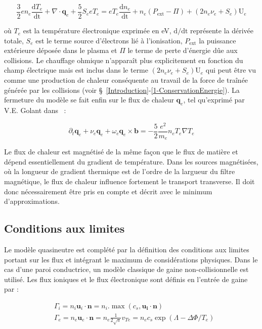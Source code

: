 \begin{refsection}
\begin{equation}
\label{1-eqTemperature2}
\frac{3}{2}en_e\frac{\text{d}T_e}{\text{dt}}+\nabla\cdot\mathbf
q_e + \frac{5}{2}S_e eT_e = eT_e\frac{\text{d}n_e}{\text{dt}}+ 
{n_e\left(P_\text{ext}-\Pi\right)}+(2n_e\nu_e+S_e)\text{U}_e
\end{equation}

où $T_e$ est la température électronique exprimée en eV, $\text{d/dt}$
représente la dérivée totale, $S_e$ est le terme source d'électrons lié à
l'ionisation, $P_\text{ext}$ la puissance extérieure déposée dans le plasma et
$\Pi$ le terme de perte d'énergie dûe aux collisions. Le chauffage
ohmique n'apparaît plus explicitement en fonction du champ électrique mais est
inclus dans le terme $(2n_e\nu_e+S_e)\text{U}_e$ qui peut être vu comme une
production de chaleur conséquente au travail de la force de traînée générée par
les collisions (voir \S~\ref{Introduction}-\ref{1-ConservationEnergie}).
La fermeture du modèle se fait enfin sur le flux de chaleur $\mathbf{q}_e$, tel qu'exprimé par V.E. Golant
dans~\parencite{Golant} :

\begin{equation}
\partial_t \mathbf{q}_e + \nu_e\mathbf{q}_e+\omega_e\mathbf{q}_e\times\mathbf{b} =
-\frac{5}{2}\frac{e^2}{m_e}n_eT_e\nabla T_e
\end{equation}

Le flux de chaleur est magnétisé de la même façon que le flux de matière et
dépend essentiellement du gradient de température. Dans les sources magnétisées,
où la longueur de gradient thermique est de l'ordre de la largueur
du filtre magnétique, le flux de chaleur influence fortement le transport
transverse. Il doit donc nécessairement être pris en compte et décrit
avec le minimum d'approximations.

\subsection{Conditions aux limites}
Le modèle quasineutre est complété par la
définition des conditions aux limites portant sur les flux et intégrant le
maximum de considérations physiques. Dans le cas d'une paroi conductrice, un
modèle classique de gaine non-collisionnelle est utilisé. Les flux ioniques et
le flux électronique sont définis en l'entrée de gaine par :

\begin{align}
&\Gamma_i=n_i\mathbf{u}_i\cdot\mathbf{n}=n_i.\max\left(c_s,\mathbf{u_i}\cdot\mathbf{n}\right)
\\
&\Gamma_e=n_e\mathbf{u}_e\cdot\mathbf{n}=n_e\frac{1}{2\sqrt{\pi}}v_{Te}=n_ec_s\exp(\Lambda-\Delta
\Phi/T_e)
\end{align}


\end{refsection}
